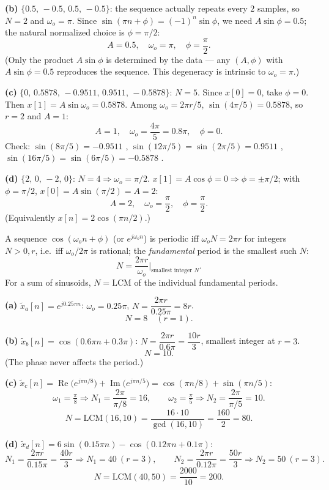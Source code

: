 \textbf{(b)} $\{0.5,\,-0.5,\,0.5,\,-0.5\}$: the sequence actually repeats every $2$ samples,
so $N=2$ and $\omega_o=\pi$. Since
$\sin(\pi n+\phi)=(-1)^{n}\sin\phi$, we need $A\sin\phi=0.5$; the natural normalized choice
is $\phi=\pi/2$:
\[
\boxed{\;A=0.5,\quad \omega_o=\pi,\quad \phi=\frac{\pi}{2}.\;}
\]
(Only the product $A\sin\phi$ is determined by the data --- any $(A,\phi)$ with
$A\sin\phi=0.5$ reproduces the sequence. This degeneracy is intrinsic to $\omega_o=\pi$.)

\textbf{(c)} $\{0,\,0.5878,\,-0.9511,\,0.9511,\,-0.5878\}$: $N=5$. Since $x[0]=0$, take
$\phi=0$. Then $x[1]=A\sin\omega_o=0.5878$. Among $\omega_o=2\pi r/5$,
$\sin(4\pi/5)=0.5878$, so $r=2$ and $A=1$:
\[
\boxed{\;A=1,\quad \omega_o=\frac{4\pi}{5}=0.8\pi,\quad \phi=0.\;}
\]
Check: $\sin(8\pi/5)=-0.9511$ \checkmark, $\sin(12\pi/5)=\sin(2\pi/5)=0.9511$ \checkmark,
$\sin(16\pi/5)=\sin(6\pi/5)=-0.5878$ \checkmark.

\textbf{(d)} $\{2,\,0,\,-2,\,0\}$: $N=4\Rightarrow \omega_o=\pi/2$.
$x[1]=A\cos\phi=0\Rightarrow \phi=\pm\pi/2$; with $\phi=\pi/2$, $x[0]=A\sin(\pi/2)=A=2$:
\[
\boxed{\;A=2,\quad \omega_o=\frac{\pi}{2},\quad \phi=\frac{\pi}{2}.\;}
\]
(Equivalently $x[n]=2\cos(\pi n/2)$.)


A sequence $\cos(\omega_o n+\phi)$ (or $e^{j\omega_o n}$) is periodic iff
$\omega_o N=2\pi r$ for integers $N>0,r$, i.e.\ iff $\omega_o/2\pi$ is rational; the
\emph{fundamental} period is the smallest such $N$:
\[
N=\frac{2\pi r}{\omega_o}\Bigg|_{\text{smallest integer }N} .
\]
For a sum of sinusoids, $N=\mathrm{LCM}$ of the individual fundamental periods.

\textbf{(a)} $\tilde{x}_a[n]=e^{j0.25\pi n}$: $\omega_o=0.25\pi$, $N=\dfrac{2\pi r}{0.25\pi}=8r$.
\[
\boxed{\;N=8 \quad (r=1).\;}
\]

\textbf{(b)} $\tilde{x}_b[n]=\cos(0.6\pi n+0.3\pi)$: $N=\dfrac{2\pi r}{0.6\pi}=\dfrac{10r}{3}$,
smallest integer at $r=3$.
\[
\boxed{\;N=10 .\;}
\]
(The phase never affects the period.)

\textbf{(c)} $\tilde{x}_c[n]=\operatorname{Re}\bigl(e^{j\pi n/8}\bigr)+\operatorname{Im}\bigl(e^{j\pi n/5}\bigr)
=\cos(\pi n/8)+\sin(\pi n/5)$:
\[
\omega_1=\tfrac{\pi}{8}\Rightarrow N_1=\frac{2\pi}{\pi/8}=16,\qquad
\omega_2=\tfrac{\pi}{5}\Rightarrow N_2=\frac{2\pi}{\pi/5}=10 .
\]
\[
\boxed{\;N=\mathrm{LCM}(16,10)=\frac{16\cdot 10}{\gcd(16,10)}=\frac{160}{2}=80 .\;}
\]

\textbf{(d)} $\tilde{x}_d[n]=6\sin(0.15\pi n)-\cos(0.12\pi n+0.1\pi)$:
\[
N_1=\frac{2\pi r}{0.15\pi}=\frac{40r}{3}\Rightarrow N_1=40\ (r=3),\qquad
N_2=\frac{2\pi r}{0.12\pi}=\frac{50r}{3}\Rightarrow N_2=50\ (r=3).
\]
\[
\boxed{\;N=\mathrm{LCM}(40,50)=\frac{2000}{10}=200 .\;}
\]

